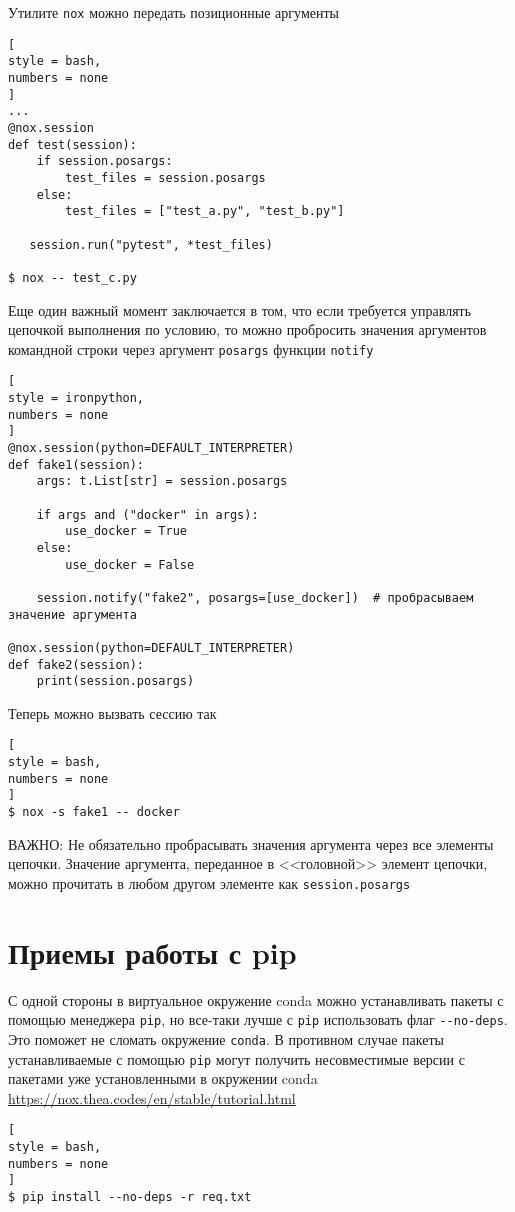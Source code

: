 \documentclass[%
	11pt,
	a4paper,
	utf8,
		]{article}
\begin{document}
Утилите \verb|nox| можно передать позиционные аргументы
\begin{lstlisting}[
style = bash,
numbers = none
]
...
@nox.session
def test(session):
    if session.posargs:
        test_files = session.posargs
    else:
        test_files = ["test_a.py", "test_b.py"]
        
   session.run("pytest", *test_files)
   
$ nox -- test_c.py
\end{lstlisting}

Еще один важный момент заключается в том, что если требуется управлять цепочкой выполнения по условию, то можно пробросить значения аргументов командной строки через аргумент \verb|posargs| функции \verb|notify|
\begin{lstlisting}[
style = ironpython,
numbers = none
]
@nox.session(python=DEFAULT_INTERPRETER)
def fake1(session):
    args: t.List[str] = session.posargs
    
    if args and ("docker" in args):
        use_docker = True
    else:
        use_docker = False
        
    session.notify("fake2", posargs=[use_docker])  # пробрасываем значение аргумента
    
@nox.session(python=DEFAULT_INTERPRETER)
def fake2(session):
    print(session.posargs)
\end{lstlisting}

Теперь можно вызвать сессию так
\begin{lstlisting}[
style = bash,
numbers = none
]
$ nox -s fake1 -- docker
\end{lstlisting}

ВАЖНО: Не обязательно пробрасывать значения аргумента через все элементы цепочки. Значение аргумента, переданное в <<головной>> элемент цепочки, можно прочитать в любом другом элементе как \verb|session.posargs|


\section{Приемы работы с pip}

С одной стороны в виртуальное окружение conda можно устанавливать пакеты с помощью менеджера \verb|pip|, но все-таки лучше с \verb|pip| использовать флаг \verb|--no-deps|. Это поможет не сломать окружение \verb|conda|. В противном случае пакеты устанавливаемые с помощью \verb|pip| могут получить несовместимые версии с пакетами уже установленными в окружении conda \url{https://nox.thea.codes/en/stable/tutorial.html}
\begin{lstlisting}[
style = bash,
numbers = none	
]
$ pip install --no-deps -r req.txt
\end{lstlisting}
\end{document}
